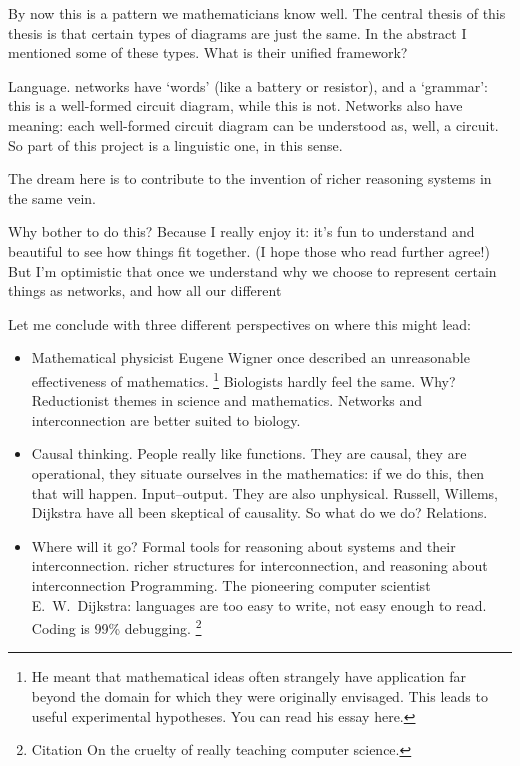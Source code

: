 By now this is a pattern we mathematicians know well. The central thesis of this
thesis is that certain types of diagrams are just the same. In the abstract I
mentioned some of these types. What is their unified framework? 

Language. networks have `words' (like a battery or resistor), and a `grammar':
this is a well-formed circuit diagram, while this is not. Networks also have
meaning: each well-formed circuit diagram can be understood as, well, a circuit.
So part of this project is a linguistic one, in this sense.

The dream here is to contribute to the invention of richer reasoning systems in
the same vein.

Why bother to do this? Because I really enjoy it: it's fun to understand and
beautiful to see how things fit together. (I hope those who read further agree!)
But I'm optimistic that once we understand why we choose to represent certain
things as networks, and how all our different 

Let me conclude with three different perspectives on where this might lead:

\begin{itemize}
  \item Mathematical physicist Eugene Wigner once described an unreasonable
    effectiveness of mathematics. \footnote{He meant that mathematical ideas
      often strangely have application far beyond the domain for which they were
      originally envisaged. This leads to useful experimental hypotheses. You
      can read his essay here.} Biologists hardly feel the same.
Why? Reductionist themes in science and mathematics. Networks and interconnection are better suited to biology.

\item Causal thinking. 
People really like functions. They are causal, they are operational, they situate ourselves in the mathematics: if we do this, then that will happen. Input--output. They are also unphysical. Russell, Willems, Dijkstra have all been skeptical of causality. So what do we do? Relations.

\item Where will it go? Formal tools for reasoning about systems and their
  interconnection.  richer structures for interconnection, and reasoning about
  interconnection Programming. The pioneering computer scientist E.\ W.\
  Dijkstra: languages are too easy to write, not easy enough to read. Coding is
  99\% debugging. \footnote{Citation On the cruelty of really teaching computer
  science.}
\end{itemize}

